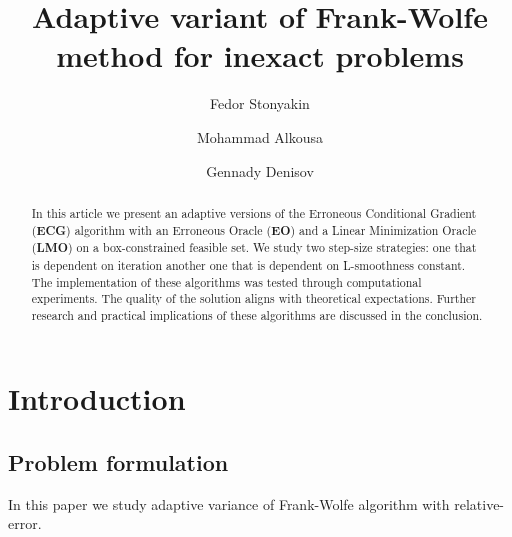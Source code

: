 \documentclass[runningheads, final]{llncs}
\begin{document}
%
\title{Adaptive variant of Frank-Wolfe method for inexact problems}
%
%
\author{Fedor Stonyakin \and
    Mohammad Alkousa \and
    Gennady Denisov}
%
%
%
\maketitle              %
%
\begin{abstract}
    In this article we present an adaptive versions of the Erroneous
    Conditional Gradient (\textbf{ECG}) algorithm with an
    Erroneous Oracle (\textbf{EO}) and a Linear Minimization Oracle (\textbf{LMO})
    on a box-constrained feasible set. We study two step-size strategies:
    one that is dependent on iteration another one that is dependent on
    L-smoothness constant. The implementation of these algorithms was tested through
    computational experiments. The quality of the solution aligns
    with theoretical expectations.
    Further research and practical implications of these algorithms are discussed in
    the conclusion.

\end{abstract}
%
%
%
\section{Introduction}
\subsection{Problem formulation}

In this paper we study adaptive variance of Frank-Wolfe
\cite{frankwolfe:1956} algorithm with relative-error.
\end{document}
